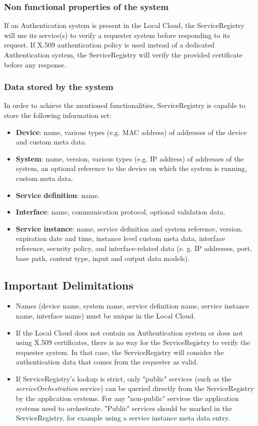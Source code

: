 \documentclass[a4paper]{arrowhead}
\begin{document}
\subsubsection {Non functional properties of the system}
If an Authentication system is present in the Local Cloud, the ServiceRegistry will use its service(s) to verify a requester system before responding to its request. If X.509 authentication policy is used instead of a dedicated Authentication system, the ServiceRegistry will verify the provided certificate before any response.

\subsubsection {Data stored by the system}
In order to achieve the mentioned functionalities, ServiceRegistry is capable to store the following information set:

\begin{itemize}
    \item \textbf{Device}: name, various types (e.g. MAC address) of addresses of the device and custom meta data.
    \item \textbf{System}: name, version, various types (e.g. IP address) of addresses of the system, an optional reference to the device on which the system is running, custom meta data. 
    \item \textbf{Service definition}: name.
    \item \textbf{Interface}: name, communication protocol, optional validation data.
    \item \textbf{Service instance}: name, service definition and system reference, version, expiration date and time, instance level custom meta data, interface reference, security policy, and interface-related data (e. g. IP addresses, port, base path, content type, input and output data models).
\end{itemize}

\subsection{Important Delimitations}
\label{sec:delimitations}

\begin{itemize}
    \item Names (device name, system name, service definition name, service instance name, interface name) must be unique in the Local Cloud.
    \item If the Local Cloud does not contain an Authentication system or does not using X.509 certificates, there is no way for the ServiceRegistry to verify the requester system. In that case, the ServiceRegistry will consider the authentication data that comes from the requester as valid.
    \item If ServiceRegistry's lookup is strict, only "public" services (such as the \textit{serviceOrchestration} service) can be queried directly from the ServiceRegistry by the application systems. For any "non-public" services the application systems need to orchestrate. "Public" services should be marked in the ServiceRegistry, for example using a service instance meta data entry.
\end{itemize}
\end{document}
